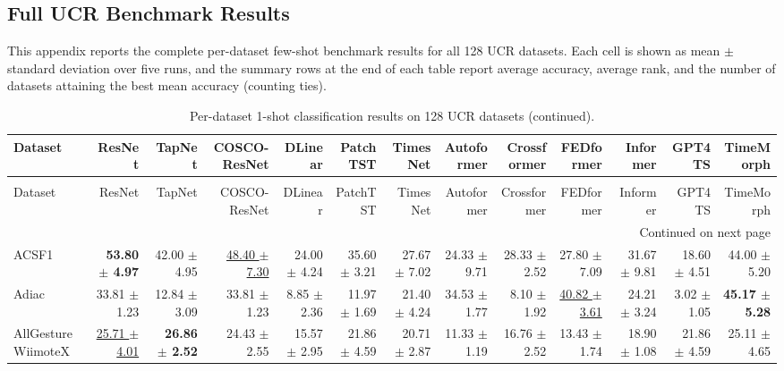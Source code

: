 \begin{landscape}
\section{Full UCR Benchmark Results}
\label{app:full-ucr-results}
This appendix reports the complete per-dataset few-shot benchmark results for all 128 UCR datasets. Each cell is shown as mean $\pm$ standard deviation over five runs, and the summary rows at the end of each table report average accuracy, average rank, and the number of datasets attaining the best mean accuracy (counting ties).

\begingroup
\setlength{\tabcolsep}{1pt}
\fontsize{5}{6}\selectfont
\begin{longtable}{lrrrrrrrrrrrr}
\caption{Per-dataset 1-shot classification results on 128 UCR datasets. Each value is reported as mean $\pm$ standard deviation over 5 runs.}\label{tab:ucr_fewshot_paper_current-paper-shot-1}\\
\toprule
Dataset & ResNet & TapNet & COSCO-ResNet & DLinear & PatchTST & TimesNet & Autoformer & Crossformer & FEDformer & Informer & GPT4TS & TimeMorph \\
\midrule
\endfirsthead
\caption[]{Per-dataset 1-shot classification results on 128 UCR datasets (continued).}\\
\toprule
Dataset & ResNet & TapNet & COSCO-ResNet & DLinear & PatchTST & TimesNet & Autoformer & Crossformer & FEDformer & Informer & GPT4TS & TimeMorph \\
\midrule
\endhead
\midrule \multicolumn{13}{r}{Continued on next page} \\
\endfoot
\bottomrule
\endlastfoot
ACSF1 & \textbf{53.80 $\pm$ 4.97} & 42.00 $\pm$ 4.95 & \underline{48.40 $\pm$ 7.30} & 24.00 $\pm$ 4.24 & 35.60 $\pm$ 3.21 & 27.67 $\pm$ 7.02 & 24.33 $\pm$ 9.71 & 28.33 $\pm$ 2.52 & 27.80 $\pm$ 7.09 & 31.67 $\pm$ 9.81 & 18.60 $\pm$ 4.51 & 44.00 $\pm$ 5.20 \\
Adiac & 33.81 $\pm$ 1.23 & 12.84 $\pm$ 3.09 & 33.81 $\pm$ 1.23 & 8.85 $\pm$ 2.36 & 11.97 $\pm$ 1.69 & 21.40 $\pm$ 4.24 & 34.53 $\pm$ 1.77 & 8.10 $\pm$ 1.92 & \underline{40.82 $\pm$ 3.61} & 24.21 $\pm$ 3.24 & 3.02 $\pm$ 1.05 & \textbf{45.17 $\pm$ 5.28} \\
AllGestureWiimoteX & \underline{25.71 $\pm$ 4.01} & \textbf{26.86 $\pm$ 2.52} & 24.43 $\pm$ 2.55 & 15.57 $\pm$ 2.95 & 21.86 $\pm$ 4.59 & 20.71 $\pm$ 2.87 & 11.33 $\pm$ 1.19 & 16.76 $\pm$ 2.52 & 13.43 $\pm$ 1.74 & 18.90 $\pm$ 1.08 & 21.86 $\pm$ 4.59 & 25.11 $\pm$ 4.65 \\

\end{longtable}
\end{landscape}
